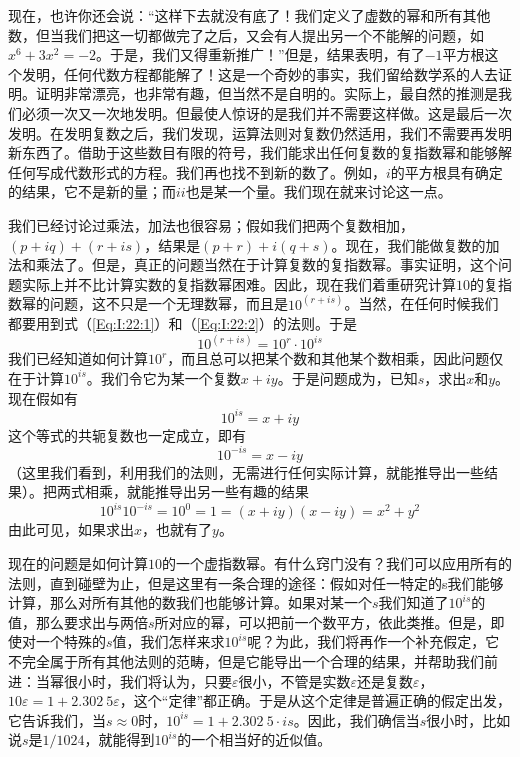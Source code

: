 现在，也许你还会说：“这样下去就没有底了！我们定义了虚数的幂和所有其他数，但当我们把这一切都做完了之后，又会有人提出另一个不能解的问题，如$x^6+3x^2=-2$。于是，我们又得重新推广！”但是，结果表明，有了$-1$平方根这个发明，任何代数方程都能解了！这是一个奇妙的事实，我们留给数学系的人去证明。证明非常漂亮，也非常有趣，但当然不是自明的。实际上，最自然的推测是我们必须一次又一次地发明。但最使人惊讶的是我们并不需要这样做。这是最后一次发明。在发明复数之后，我们发现，运算法则对复数仍然适用，我们不需要再发明新东西了。借助于这些数目有限的符号，我们能求出任何复数的复指数幂和能够解任何写成代数形式的方程。我们再也找不到新的数了。例如，$i$的平方根具有确定的结果，它不是新的量；而$ii$也是某一个量。我们现在就来讨论这一点。

我们已经讨论过乘法，加法也很容易；假如我们把两个复数相加，$(p+iq)+(r+is)$，结果是$(p+r)+i(q+s)$。现在，我们能做复数的加法和乘法了。但是，真正的问题当然在于计算复数的复指数幂。事实证明，这个问题实际上并不比计算实数的复指数幂困难。因此，现在我们着重研究计算$10$的复指数幂的问题，这不只是一个无理数幂，而且是$10^{(r+is)}$。当然，在任何时候我们都要用到式（\ref{Eq:I:22:1}）和（\ref{Eq:I:22:2}）的法则。于是
\begin{equation}
    \label{Eq:I:22:5}
    10^{(r+is)}=10^r\cdot 10^{is}
\end{equation}
我们已经知道如何计算$10^r$，而且总可以把某个数和其他某个数相乘，因此问题仅在于计算$10^{is}$。我们令它为某一个复数$x+iy$。于是问题成为，已知$s$，求出$x$和$y$。现在假如有
\begin{equation*}
    10^{is} = x + iy
\end{equation*}
这个等式的共轭复数也一定成立，即有
\begin{equation*}
    10^{-is} = x - iy
\end{equation*}
（这里我们看到，利用我们的法则，无需进行任何实际计算，就能推导出一些结果）。把两式相乘，就能推导出另一些有趣的结果
\begin{equation}
    \label{Eq:I:22:6}
    10^{is}10^{-is}=10^0=1=(x+iy)(x-iy)=x^2+y^2
\end{equation}
由此可见，如果求出$x$，也就有了$y$。

现在的问题是如何计算$10$的一个虚指数幂。有什么窍门没有？我们可以应用所有的法则，直到碰壁为止，但是这里有一条合理的途径：假如对任一特定的s我们能够计算，那么对所有其他的数我们也能够计算。如果对某一个$s$我们知道了$10^{is}$的值，那么要求出与两倍$s$所对应的幂，可以把前一个数平方，依此类推。但是，即使对一个特殊的$s$值，我们怎样来求$10^{is}$呢？为此，我们将再作一个补充假定，它不完全属于所有其他法则的范畴，但是它能导出一个合理的结果，并帮助我们前进：当幂很小时，我们将认为，只要$\varepsilon$很小，不管是实数$\varepsilon$还是复数$\varepsilon$，$10\varepsilon=1+2.302~5\varepsilon$，这个“定律”都正确。于是从这个定律是普遍正确的假定出发，它告诉我们，当$s\approx 0$时，$10^{is}=1+2.302~5\cdot is$。因此，我们确信当$s$很小时，比如说$s$是$1/1 024$，就能得到$10^{is}$的一个相当好的近似值。

